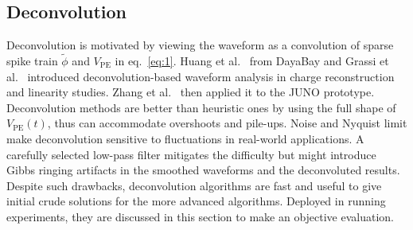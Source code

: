 \subsection{Deconvolution}
\label{sec:deconv}
Deconvolution is motivated by viewing the waveform as a convolution of sparse spike train $\tilde{\phi}$ and $V_\mathrm{PE}$ in eq.~\eqref{eq:1}.  Huang et al.~\cite{huang_flash_2018} from DayaBay and Grassi et al.~\cite{grassi_charge_2018} introduced deconvolution-based waveform analysis in charge reconstruction and linearity studies.  Zhang et al.~\cite{zhang_comparison_2019} then applied it to the JUNO prototype.  Deconvolution methods are better than heuristic ones by using the full shape of $V_\mathrm{PE}(t)$, thus can accommodate overshoots and pile-ups.  Noise and Nyquist limit make deconvolution sensitive to fluctuations in real-world applications.  A carefully selected low-pass filter mitigates the difficulty but might introduce Gibbs ringing artifacts in the smoothed waveforms and the deconvoluted results. Despite such drawbacks, deconvolution algorithms are fast and useful to give initial crude solutions for the more advanced algorithms.  Deployed in running experiments, they are discussed in this section to make an objective evaluation. 

